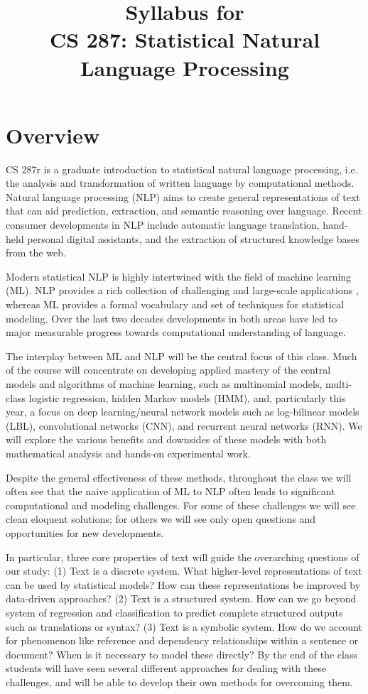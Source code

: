 \documentclass[11pt]{article}
\title{Syllabus for \\ CS 287: Statistical Natural Language Processing}
\date{}
\begin{document}
\maketitle{}

\vspace{-1.75cm}
\section{Overview}

CS 287r is a graduate introduction to statistical natural language
processing, i.e. the analysis and transformation of written language
by computational methods.  Natural language processing (NLP) aims
to create general representations of text that can aid prediction,
extraction, and semantic reasoning over language. Recent consumer
developments in NLP include automatic language translation, hand-held
personal digital assistants, and the extraction of structured
knowledge bases from the web.

Modern statistical NLP is highly intertwined with the field of machine
learning (ML). NLP provides a rich collection of challenging and
large-scale applications , whereas ML provides a formal vocabulary and
set of techniques for statistical modeling. Over the last two decades
developments in both areas have led to major measurable progress
towards computational understanding of language. 

The interplay between ML and NLP will be the central focus of this
class. Much of the course will concentrate on developing applied
mastery of the central models and algorithms of machine learning, such
as multinomial models, multi-class logistic regression, hidden Markov
models (HMM), and, particularly this year, a focus on deep
learning/neural network models such as log-bilinear models (LBL),
convolutional networks (CNN), and recurrent neural networks (RNN).  We
will explore the various benefits and downsides of these models with
both mathematical analysis and hands-on experimental work.

Despite the general effectiveness of these methods, throughout the
class we will often see that the naive application of ML to NLP often
leads to significant computational and modeling challenges. For some
of these challenges we will see clean eloquent solutions; for others
we will see only open questions and opportunities for new
developments. 

In particular, three core properties of text will guide the
overarching questions of our study: (1) Text is a discrete
system. What higher-level representations of text can be used by
statistical models? How can these representations be improved by
data-driven approaches? (2) Text is a structured system. How can we go
beyond system of regression and classification to predict complete
structured outputs such as translations or syntax? (3) Text is a
symbolic system. How do we account for phenomenon like reference and
dependency relationships within a sentence or document? When is it
necessary to model these directly? By the end of the class students
will have seen several different approaches for dealing with these
challenges, and will be able to develop their own methods for
overcoming them.
\end{document}
